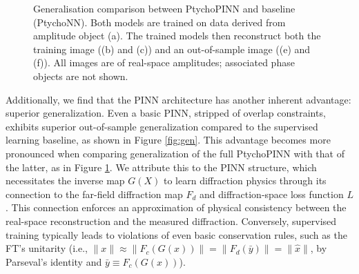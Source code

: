 \documentclass[sn-mathphys]{sn-jnl}%
\theoremstyle{thmstyleone}%
\theoremstyle{thmstyletwo}%
\theoremstyle{thmstylethree}%
\begin{document}

\begin{figure}%
    \centering
\vfill
    \caption{Generalisation comparison between PtychoPINN and baseline (PtychoNN). Both models are trained on data derived from amplitude object (a). The trained models then reconstruct both the training image ((b) and (c)) and an out-of-sample image ((e) and (f)). All images are of real-space amplitudes; associated phase objects are not shown.  }%
    \label{fig:gen_detailed}%
\end{figure}


Additionally, we find that the PINN architecture has another inherent advantage: superior generalization. Even a basic PINN, stripped of overlap constraints, exhibits superior out-of-sample generalization compared to the supervised learning baseline, as shown in Figure \ref{fig:gen}. This advantage becomes more pronounced when comparing generalization of the full PtychoPINN with that of the latter, as in Figure \ref{fig:gen_detailed}. 
We attribute this to the PINN structure, which necessitates the inverse map $G(X)$ to learn diffraction physics through its connection to the far-field diffraction map $F_d$ and diffraction-space loss function $L$. This connection enforces an approximation of physical consistency between the real-space reconstruction and the measured diffraction. Conversely, supervised training typically leads to violations of even basic conservation rules, such as the FT's unitarity (i.e., $\lVert x \rVert \approx \lVert F_c(G(x)) \rVert = \lVert F_d(\bar{y}) \rVert = \lVert \hat{x} \rVert$, by Parseval's identity and $\bar{y} \equiv F_c(G(x))$).
\end{document}
